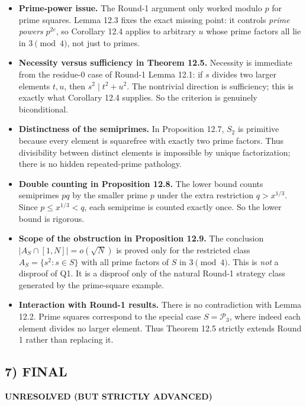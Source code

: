 \begin{itemize}
\item \textbf{Prime-power issue.}
The Round-1 argument only worked modulo $p$ for prime squares.
Lemma 12.3 fixes the exact missing point: it controls \emph{prime powers} $p^{2e}$, so Corollary 12.4 applies to arbitrary $u$ whose prime factors all lie in $3\pmod 4$, not just to primes.

\item \textbf{Necessity versus sufficiency in Theorem 12.5.}
Necessity is immediate from the residue-$0$ case of Round-1 Lemma 12.1: if $s$ divides two larger elements $t,u$, then $s^2\mid t^2+u^2$.
The nontrivial direction is sufficiency; this is exactly what Corollary 12.4 supplies.
So the criterion is genuinely biconditional.

\item \textbf{Distinctness of the semiprimes.}
In Proposition 12.7, $S_2$ is primitive because every element is squarefree with exactly two prime factors.
Thus divisibility between distinct elements is impossible by unique factorization; there is no hidden repeated-prime pathology.

\item \textbf{Double counting in Proposition 12.8.}
The lower bound counts semiprimes $pq$ by the smaller prime $p$ under the extra restriction $q>x^{1/3}$.
Since $p\le x^{1/3}<q$, each semiprime is counted exactly once.
So the lower bound is rigorous.

\item \textbf{Scope of the obstruction in Proposition 12.9.}
The conclusion $|A_S\cap[1,N]|=o(\sqrt N)$ is proved only for the restricted class $A_S=\{s^2:s\in S\}$ with all prime factors of $S$ in $3\pmod 4$.
This is \emph{not} a disproof of Q1.
It is a disproof only of the natural Round-1 strategy class generated by the prime-square example.

\item \textbf{Interaction with Round-1 results.}
There is no contradiction with Lemma 12.2.
Prime squares correspond to the special case $S=\mathcal P_3$, where indeed each element divides no larger element.
Thus Theorem 12.5 strictly extends Round 1 rather than replacing it.
\end{itemize}

\subsection*{7) FINAL}

\textbf{UNRESOLVED (BUT STRICTLY ADVANCED)}

